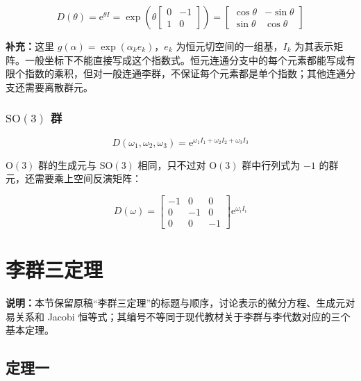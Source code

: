 \begin{equation}
D\left(\theta\right)
=\mathrm{e}^{\theta I}
=\exp\left(\theta
\begin{bmatrix}
0 &-1 \\
1 &0
\end{bmatrix}
\right)
=\begin{bmatrix}
\cos\theta &-\sin\theta \\
\sin\theta &\cos\theta
\end{bmatrix}
\end{equation}

\textbf{补充：}这里 $g\left(\alpha\right)=\exp\left(\alpha_k e_k\right)$，$e_k$ 为恒元切空间的一组基，$I_k$ 为其表示矩阵。一般坐标下不能直接写成这个指数式。恒元连通分支中的每个元素都能写成有限个指数的乘积，但对一般连通李群，不保证每个元素都是单个指数；其他连通分支还需要离散群元。

\subsubsection*{\texorpdfstring{$\mathrm{SO}\left(3\right)$ 群}{SO(3) 群}}

\begin{equation}
D\left(\omega_1,\omega_2,\omega_3\right)
=\mathrm{e}^{\omega_1 I_1 + \omega_2 I_2 + \omega_3 I_3}
\end{equation}

$\mathrm{O}\left(3\right)$ 群的生成元与 $\mathrm{SO}\left(3\right)$ 相同，只不过对 $\mathrm{O}\left(3\right)$ 群中行列式为 $-1$ 的群元，还需要乘上空间反演矩阵：

\begin{equation}
D\left(\omega\right)
=\begin{bmatrix}
-1 &0 &0 \\
0 &-1 &0 \\
0 &0 &-1
\end{bmatrix}
\mathrm{e}^{\omega_i I_i}
\end{equation}

\section{李群三定理}

\textbf{说明：}本节保留原稿“李群三定理”的标题与顺序，讨论表示的微分方程、生成元对易关系和 Jacobi 恒等式；其编号不等同于现代教材关于李群与李代数对应的三个基本定理。

\subsection{定理一}

